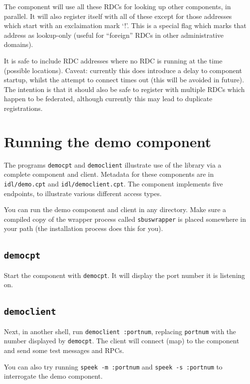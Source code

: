 \documentclass[12pt,a4paper,twoside]{article}
\renewcommand{\_}{\texttt{\symbol{95}}}
\begin{document}
The component will use all these RDCs for looking up other components, in
parallel. It will also register itself with all of these except for those
addresses which start with an exclaimation mark `!'. This is a special flag
which marks that address as lookup-only (useful for ``foreign'' RDCs
in other administrative domains).

It is safe to include RDC addresses where no RDC is running at the
time (possible locations). Caveat: currently this does introduce a
delay to component startup, whilst the attempt to connect times out
(this will be avoided in future). The intention is that it should also
be safe to register with multiple RDCs which happen to be federated,
although currently this may lead to duplicate registrations.

\section{Running the demo component}

The programs \verb^democpt^ and \verb^democlient^ illustrate
use of the library via a complete component and client.
Metadata for these components are in \verb^idl/demo.cpt^
and \verb^idl/democlient.cpt^.
The component implements five endpoints, to illustrate various
different access types.

You can run the demo component and client in any directory.
Make sure a compiled copy of the wrapper process called \verb^sbuswrapper^ is
placed somewhere in your path (the installation process does this for you).

\subsection{\texttt{democpt}}

Start the component with
\verb^democpt^. It will display the port number it is listening on.

\subsection{\texttt{democlient}}

Next, in another shell, run
\verb^democlient :portnum^, replacing \verb^portnum^ with the number
displayed by \verb^democpt^. The client will connect (map) to
the component and send some test messages and RPCs.

You can also try running \verb^speek -m :portnum^ and
\verb^speek -s :portnum^ to interrogate the demo component.
\end{document}
